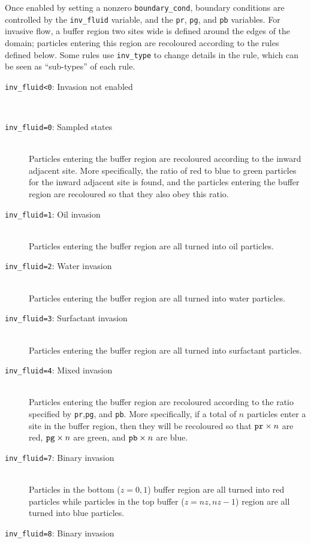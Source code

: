 \documentclass[a4paper]{article}
\begin{document}
Once enabled by setting a nonzero {\tt boundary\_cond}, boundary conditions are
controlled by the {\tt inv\_fluid} variable, and the {\tt pr}, {\tt pg},
and {\tt pb} variables. For invasive flow, a buffer region two sites wide is
defined around the edges of the domain; particles entering this region are
recoloured according to the rules defined below. Some rules use {\tt inv\_type} 
to change details in the rule, which can be seen as ``sub-types'' of each rule.

\begin{description}
	\item[{\tt inv\_fluid<0}: Invasion not enabled]\ \\
	\item[{\tt inv\_fluid=0}: Sampled states]\ \\
		Particles entering the buffer region are recoloured
		according to the inward adjacent site.
		More specifically, the ratio of red to blue to green
		particles for the inward adjacent site is found, and the
		particles entering the buffer region are recoloured so
		that they also obey this ratio.
	\item[{\tt inv\_fluid=1}: Oil invasion]\ \\
		Particles entering the buffer region are all turned into
		oil particles.
	\item[{\tt inv\_fluid=2}: Water invasion]\ \\
		Particles entering the buffer region are all turned into
		water particles.
	\item[{\tt inv\_fluid=3}: Surfactant invasion]\ \\
		Particles entering the buffer region are all turned into
		surfactant particles.
	\item[{\tt inv\_fluid=4}: Mixed invasion]\ \\
		Particles entering the buffer region are recoloured
		according to the ratio specified by {\tt pr},{\tt pg},
		and {\tt pb}. More specifically, if a total of $n$ particles 
		enter a site in the buffer region, then they will be
		recoloured so that ${\tt pr} \times n$ are red, ${\tt
		pg} \times n$ are green, and ${\tt pb} \times n$ are
		blue.
	\item[{\tt inv\_fluid=7}: Binary invasion]\ \\
		Particles in the bottom ($z=0,1$) buffer region are all turned into
		red particles while particles in the top buffer ($z=nz,nz-1$) region
                are all turned into blue particles.
	\item[{\tt inv\_fluid=8}: Binary invasion]\ \\

\end{description}
\end{document}
